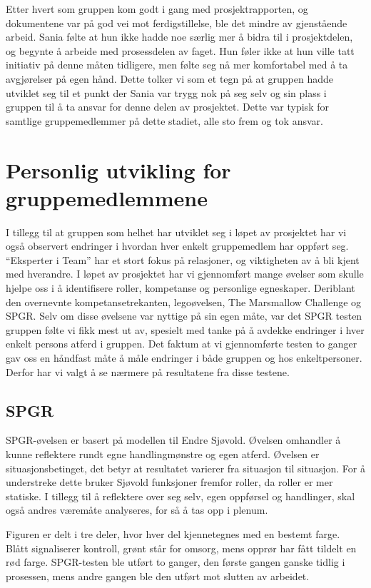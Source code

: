 \documentclass[a4paper,norsk,oneside]{article}
\begin{document}
Etter hvert som gruppen kom godt i gang med prosjektrapporten, og dokumentene var på god vei mot ferdigstillelse, ble det mindre av gjenstående arbeid. Sania følte at hun ikke hadde noe særlig mer å bidra til i prosjektdelen, og begynte å arbeide med prosessdelen av faget. Hun føler ikke at hun ville tatt initiativ på denne måten tidligere, men følte seg nå mer komfortabel med å ta avgjørelser på egen hånd. Dette tolker vi som et tegn på at gruppen hadde utviklet seg til et punkt der Sania var trygg nok på seg selv og sin plass i gruppen til å ta ansvar for denne delen av prosjektet. Dette var typisk for samtlige gruppemedlemmer på dette stadiet, alle sto frem og tok ansvar. 

\section{Personlig utvikling for gruppemedlemmene}

I tillegg til at gruppen som helhet har utviklet seg i løpet av prosjektet har vi også observert endringer i hvordan hver enkelt gruppemedlem har oppført seg. “Eksperter i Team” har et stort fokus på relasjoner, og viktigheten av å bli kjent med hverandre. I løpet av prosjektet har vi gjennomført mange øvelser som skulle hjelpe oss i å identifisere roller, kompetanse og personlige egneskaper. Deriblant den overnevnte kompetansetrekanten, legoøvelsen, The Marsmallow Challenge og SPGR. Selv om disse øvelsene var nyttige på sin egen måte, var det SPGR testen gruppen følte vi fikk mest ut av, spesielt med tanke på å avdekke endringer i hver enkelt persons atferd i gruppen. Det faktum at vi gjennomførte testen to ganger gav oss en håndfast måte å måle endringer i både gruppen og hos enkeltpersoner. Derfor har vi valgt å se nærmere på resultatene fra disse testene.
	
\subsection{SPGR}
SPGR-øvelsen er basert på modellen til Endre Sjøvold.\cite{endre} Øvelsen omhandler å kunne reflektere rundt egne handlingmønstre og egen atferd. Øvelsen er situasjonsbetinget, det betyr at resultatet varierer fra situasjon til situasjon. For å understreke dette bruker Sjøvold funksjoner fremfor roller, da roller er mer statiske. I tillegg til å reflektere over seg selv, egen oppførsel og handlinger, skal også andres væremåte analyseres, for så å tas opp i plenum. 

Figuren er delt i tre deler, hvor hver del kjennetegnes med en bestemt farge. Blått signaliserer kontroll, grønt står for omsorg, mens opprør har fått tildelt en rød farge. SPGR-testen ble utført to ganger, den første gangen ganske tidlig i prosessen, mens andre gangen ble den utført mot slutten av arbeidet. 
\end{document}
